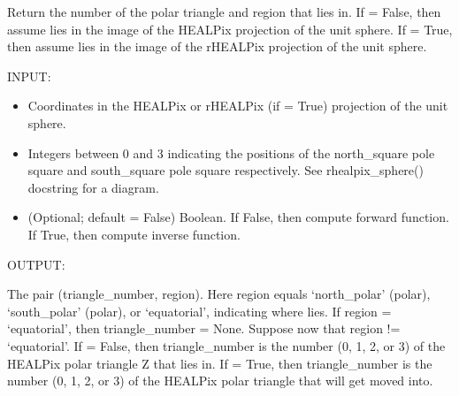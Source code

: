 \documentclass[a4paper,12ptopenany,oneside,english]{sphinxmanual}
\begin{document}
\begin{fulllineitems}
\label{\detokenize{pj_rhealpix:rhealpixdggs.pj_rhealpix.triangle}}
\pysigstartsignatures
{}
\pysigstopsignatures
\sphinxAtStartPar
Return the number of the polar triangle and region that  lies in.
If  = False, then assume  lies in the image of the HEALPix
projection of the unit sphere.
If  = True, then assume  lies in the image of the
\sphinxhyphen{}rHEALPix projection of the unit sphere.

\sphinxAtStartPar
INPUT:
\begin{itemize}
\item {} 
\sphinxAtStartPar
{} \sphinxhyphen{} Coordinates in the HEALPix or rHEALPix (if  = True)
projection of the unit sphere.

\item {} 
\sphinxAtStartPar
{} \sphinxhyphen{} Integers between 0 and 3 indicating the
positions of the north\_square pole square and south\_square pole square
respectively.
See rhealpix\_sphere() docstring for a diagram.

\item {} 
\sphinxAtStartPar
{} \sphinxhyphen{} (Optional; default = False) Boolean. If False, then compute
forward function. If True, then compute inverse function.

\end{itemize}

\sphinxAtStartPar
OUTPUT:

\sphinxAtStartPar
The pair (triangle\_number, region).
Here region equals ‘north\_polar’ (polar), ‘south\_polar’ (polar), or
‘equatorial’, indicating where  lies.
If region = ‘equatorial’, then triangle\_number = None.
Suppose now that region != ‘equatorial’.
If  = False, then triangle\_number is the number (0, 1, 2, or 3) of
the HEALPix polar triangle Z that  lies in.
If  = True, then triangle\_number is the number (0, 1, 2, or 3) of
the HEALPix polar triangle that  will get moved into.


\end{fulllineitems}
\end{document}

